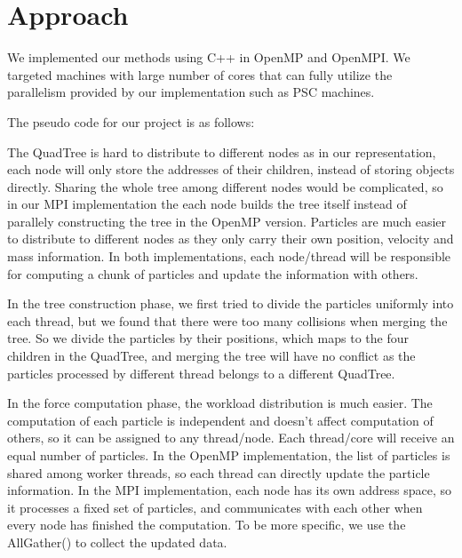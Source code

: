 \documentclass{article}
\begin{document}
\section{Approach}

We implemented our methods using C++ in OpenMP and OpenMPI. We targeted machines with large number of cores that can fully utilize the parallelism provided by our implementation such as PSC machines.

The pseudo code for our project is as follows:
\begin{algorithmic}

\EndFor
\EndFor

\end{algorithmic}

The QuadTree is hard to distribute to different nodes as in our representation, each node will only store the addresses of their children, instead of storing objects directly. Sharing the whole tree among different nodes would be complicated, so in our MPI implementation the each node builds the tree itself instead of parallely constructing the tree in the OpenMP version. Particles are much easier to distribute to different nodes as they only carry their own position, velocity and mass information. In both implementations, each node/thread will be responsible for computing a chunk of particles and update the information with others.

In the tree construction phase, we first tried to divide the particles uniformly into each thread, but we found that there were too many collisions when merging the tree. So we divide the particles by their positions, which maps to the four children in the QuadTree, and merging the tree will have no conflict as the particles processed by different thread belongs to a different QuadTree.

In the force computation phase, the workload distribution is much easier. The computation of each particle is independent and doesn't affect computation of others, so it can be assigned to any thread/node. Each thread/core will receive an equal number of particles. In the OpenMP implementation, the list of particles is shared among worker threads, so each thread can directly update the particle information. In the MPI implementation, each node has its own address space, so it processes a fixed set of particles, and communicates with each other when every node has finished the computation. To be more specific, we use the AllGather() to collect the updated data.
\end{document}

